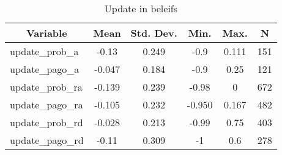 
\begin{table}[htbp]\centering \caption{Update in beleifs \label{sumstat}}
\begin{tabular}{l c c c c c}\hline\hline
\multicolumn{1}{c}{\textbf{Variable}} & \textbf{Mean}
 & \textbf{Std. Dev.}& \textbf{Min.} &  \textbf{Max.} & \textbf{N}\\ \hline
update\_prob\_a & -0.13 & 0.249 & -0.9 & 0.111 & 151\\
update\_pago\_a & -0.047 & 0.184 & -0.9 & 0.25 & 121\\
update\_prob\_ra & -0.139 & 0.239 & -0.98 & 0 & 672\\
update\_pago\_ra & -0.105 & 0.232 & -0.950 & 0.167 & 482\\
update\_prob\_rd & -0.028 & 0.213 & -0.99 & 0.75 & 403\\
update\_pago\_rd & -0.11 & 0.309 & -1 & 0.6 & 278\\
\hline\end{tabular}
\end{table}
